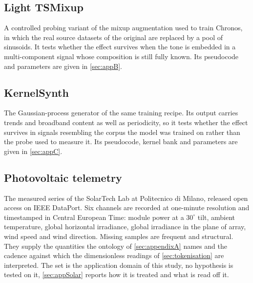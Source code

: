 \subsection*{Light TSMixup}

A controlled probing variant of the mixup augmentation used to train Chronos\autocite{ansariChronosLearningLanguage2024}, in which the real source datasets of the original are replaced by a pool of sinusoids. It tests whether the effect survives when the tone is embedded in a multi-component signal whose composition is still fully known. Its pseudocode and parameters are given in \autoref{sec:appB}.

\subsection*{KernelSynth}

The Gaussian-process generator of the same training recipe\autocite{ansariChronosLearningLanguage2024}. Its output carries trends and broadband content as well as periodicity, so it tests whether the effect survives in signals resembling the corpus the model was trained on rather than the probe used to measure it. Its pseudocode, kernel bank and parameters are given in \autoref{sec:appC}.

\subsection*{Photovoltaic telemetry}

The measured series of the SolarTech Lab at Politecnico di Milano, released open access on IEEE DataPort\autocite{levaPhotovoltaicPowerWeather2020}. Six channels are recorded at one-minute resolution and timestamped in Central European Time: module power at a $30^\circ$ tilt, ambient temperature, global horizontal irradiance, global irradiance in the plane of array, wind speed and wind direction. Missing samples are frequent and structural. They supply the quantities the ontology of \autoref{sec:appendixA} names and the cadence against which the dimensionless readings of \autoref{sec:tokenisation} are interpreted. The set is the application domain of this study, no hypothesis is tested on it, \autoref{sec:appSolar} reports how it is treated and what is read off it.
\endgroup

